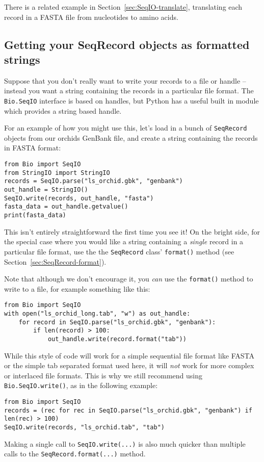 There is a related example in Section~\ref{sec:SeqIO-translate}, translating each
record in a FASTA file from nucleotides to amino acids.

\subsection{Getting your SeqRecord objects as formatted strings}
\label{sec:Bio.SeqIO-and-StringIO}
Suppose that you don't really want to write your records to a file or handle -- instead you want a string containing the records in a particular file format.  The \verb|Bio.SeqIO| interface is based on handles, but Python has a useful built in module which provides a string based handle.

For an example of how you might use this, let's load in a bunch of \verb|SeqRecord| objects from our orchids GenBank file, and create a string containing the records in FASTA format:

\begin{verbatim}
from Bio import SeqIO
from StringIO import StringIO
records = SeqIO.parse("ls_orchid.gbk", "genbank")
out_handle = StringIO()
SeqIO.write(records, out_handle, "fasta")
fasta_data = out_handle.getvalue()
print(fasta_data)
\end{verbatim}

This isn't entirely straightforward the first time you see it!  On the bright side, for the special case where you would like a string containing a \emph{single} record in a particular file format, use the the \verb|SeqRecord| class' \verb|format()| method (see Section~\ref{sec:SeqRecord-format}).

Note that although we don't encourage it, you \emph{can} use the \verb|format()| method to write to a file, for example something like this:
\begin{verbatim}
from Bio import SeqIO
with open("ls_orchid_long.tab", "w") as out_handle:
    for record in SeqIO.parse("ls_orchid.gbk", "genbank"):
        if len(record) > 100:
            out_handle.write(record.format("tab"))
\end{verbatim}
\noindent While this style of code will work for a simple sequential file format like FASTA or the simple tab separated format used here, it will \emph{not} work for more complex or interlaced file formats.  This is why we still recommend using \verb|Bio.SeqIO.write()|, as in the following example:
\begin{verbatim}
from Bio import SeqIO
records = (rec for rec in SeqIO.parse("ls_orchid.gbk", "genbank") if len(rec) > 100)
SeqIO.write(records, "ls_orchid.tab", "tab")
\end{verbatim}
\noindent Making a single call to \verb|SeqIO.write(...)| is also much quicker than
multiple calls to the \verb|SeqRecord.format(...)| method.

